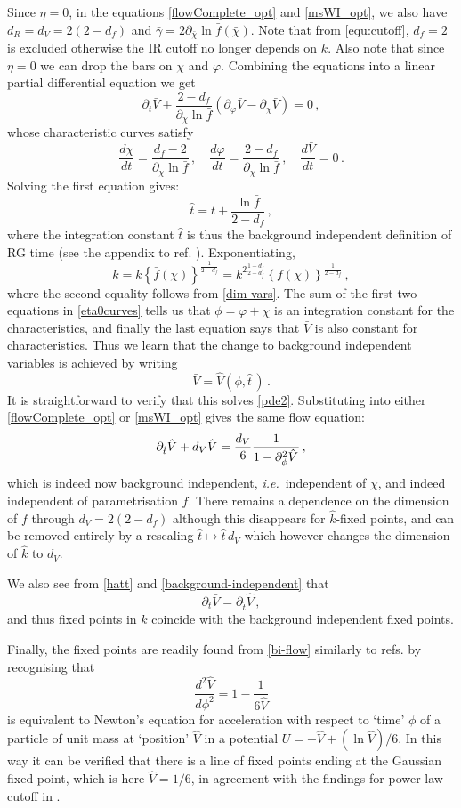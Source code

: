 \documentclass[11pt,a4paper]{article}
\numberwithin{figure}{section}
\numberwithin{equation}{section}
\newcommand\ie{\textit{i.e.}\ }
\newcommand{\be}{\begin{equation}}
\newcommand{\ee}{\end{equation}}
\newcommand{\vp}{\varphi}  %
\newcommand{\bc}{\bar \chi} %
\newcommand{\bV}{\bar V} %
\newcommand{\hV}{\hat V} %
\newcommand{\hk}{\hat k} %
\newcommand{\hatt}{\hat t} %
\begin{document}
Since $\eta=0$, in the equations \eqref{flowComplete_opt} and \eqref{msWI_opt}, we also have $d_R=d_V=2(2-d_f)$ and $\bar{\gamma}=2\partial_{\bc}\ln\bar{f}(\bc)$. Note that from \eqref{equ:cutoff}, $d_f=2$ is excluded otherwise the IR cutoff no longer depends on $k$. Also note that since $\eta=0$ we can drop the bars on $\chi$ and $\vp$.
Combining the equations into a linear partial differential equation we get
\be 
\label{pde2}
\partial_t\bV +\frac{2-d_f}{\partial_{\chi}\ln\bar{f}}\left(\partial_{\vp}\bV-\partial_{\chi}\bV\right) =0\,,
\ee
whose characteristic curves satisfy
\be 
\label{eta0curves}
\frac{d\chi}{dt}=\frac{d_f-2}{\partial_{\chi}\ln\bar{f}}\,,\quad\frac{d\vp}{dt}=\frac{2-d_f}{\partial_{\chi}\ln\bar{f}}\,,\quad \frac{d\bV}{dt}=0\,.
\ee
Solving the first equation gives:
\be 
\label{hatt}
\hatt = t+\frac{\ln\bar{f}}{2-d_f}\,,
\ee
where the integration constant $\hatt$ is thus the background independent definition of RG time (see the appendix to ref. \cite{Dietz:2015owa}). Exponentiating,
\be 
\hk = k \left\{\bar{f}(\chi)\right\}^{\frac{1}{2-d_f}} = k^{2\frac{1-d_f}{2-d_f}} \left\{f(\chi)\right\}^{\frac{1}{2-d_f}}\,,
\ee
where the second equality follows from \eqref{dim-vars}. The sum of the first two equations in \eqref{eta0curves} tells us that $\phi=\vp+\chi$ is an integration constant for the characteristics, and finally the last equation says that $\bV$ is also constant for characteristics. Thus we learn that the change to background independent variables is achieved by writing
\be 
\label{background-independent}
\bV = \hV(\phi,\hatt\,)\,.
\ee
It is straightforward to verify that this solves \eqref{pde2}. Substituting into either \eqref{flowComplete_opt} or \eqref{msWI_opt} gives the same flow equation:
\be 
\label{bi-flow}
\partial_{\hatt}\hV +d_V\hV = \frac{d_V}{6}\frac{1}{1-\partial^2_\phi\hV^{\vphantom{H^H}}}\,,
\ee
which is indeed now background independent, \ie independent of $\chi$, and indeed independent of parametrisation $f$. There remains a dependence on the dimension of $f$ through $d_V = 2(2-d_f)$ although this disappears for $\hk$-fixed points, and can be removed entirely by a rescaling $\hatt\mapsto \hatt\, d_V$ which however changes the dimension of $\hat{k}$ to $d_V$. 

We also see from \eqref{hatt} and \eqref{background-independent} that
\be 
\partial_t \bV = \partial_{\hatt} \hV\,,
\ee
and thus fixed points in $k$ coincide with the background independent fixed points. 

Finally, the fixed points are readily found from \eqref{bi-flow} similarly to refs. \cite{Dietz2016,Morris:1994jc} by recognising that 
\be 
\frac{d^2\hV}{d\phi^2} = 1-\frac{1}{6\hV}
\ee
is equivalent to Newton's equation for acceleration with respect to `time' $\phi$ of a particle of unit mass at `position' $\hV$ in a potential $U=-\hV+ (\ln\hV)/6$. In this way it can be verified that there is a line of fixed points ending at the Gaussian fixed point, which is here $\hV=1/6$, in agreement with the findings for power-law cutoff in \cite{Dietz2016}.
\end{document}
